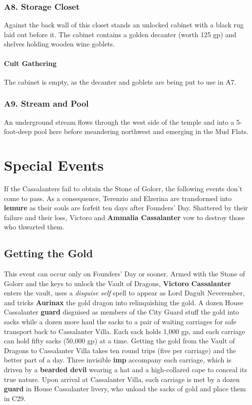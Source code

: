 \documentclass[10pt,a4paper,twoside,twocolumn,openany,nodeprecatedcode]{dndbook}
\begin{document}
\subsubsection{A8. Storage Closet}
Against the back wall of this closet stands an unlocked cabinet with a black rug laid out before it. The cabinet contains a golden decanter (worth 125 gp) and shelves holding wooden wine goblets.
\paragraph{Cult Gathering}
The cabinet is empty, as the decanter and goblets are being put to use in A7.
\subsubsection{A9. Stream and Pool}
An underground stream flows through the west side of the temple and into a 5-foot-deep pool here before meandering northwest and emerging in the Mud Flats.
\section{Special Events}
If the Cassalanters fail to obtain the Stone of Golorr, the following events don't come to pass. As a consequence, Terenzio and Elzerina are transformed into \textbf{lemure} as their souls are forfeit ten days after Founders' Day. Shattered by their failure and their loss, Victoro and \textbf{Ammalia Cassalanter} vow to destroy those who thwarted them.
\subsection{Getting the Gold}
This event can occur only on Founders' Day or sooner.
Armed with the Stone of Golorr and the keys to unlock the Vault of Dragons, \textbf{Victoro Cassalanter} enters the vault, uses a \textit{disguise self} spell to appear as Lord Dagult Neverember, and tricks \textbf{Aurinax} the gold dragon into relinquishing the gold. A dozen House Cassalanter \textbf{guard} disguised as members of the City Guard stuff the gold into sacks while a dozen more haul the sacks to a pair of waiting carriages for safe transport back to Cassalanter Villa. Each sack holds 1,000 gp, and each carriage can hold fifty sacks (50,000 gp) at a time. Getting the gold from the Vault of Dragons to Cassalanter Villa takes ten round trips (five per carriage) and the better part of a day. Three invisible \textbf{imp} accompany each carriage, which is driven by a \textbf{bearded devil} wearing a hat and a high-collared cape to conceal its true nature. Upon arrival at Cassalanter Villa, each carriage is met by a dozen \textbf{guard} in House Cassalanter livery, who unload the sacks of gold and place them in C29.
\end{document}
